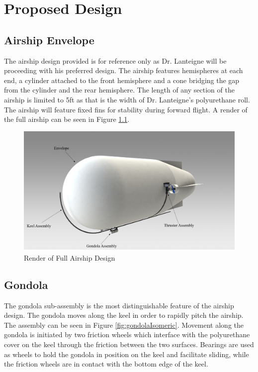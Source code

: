 \documentclass[../main.tex]{subfiles}
\begin{document}
\chapter{Proposed Design}
\section{Airship Envelope}
The airship design provided is for reference only as Dr. Lanteigne will be proceeding with his preferred design. The airship features hemispheres at each end, a cylinder attached to the front hemisphere and a cone bridging the gap from the cylinder and the rear hemisphere. The length of any section of the airship is limited to 5ft as that is the width of Dr. Lanteigne's polyurethane roll. The airship will feature fixed fins for stability during forward flight. A render of the full airship can be seen in Figure \ref{fig:fullAirship}. 

\begin{figure}[H]
	\centering
	\includegraphics[width=\textwidth]{img/design/fullAirshipPerspective.png}
	\caption{Render of Full Airship Design}
	\label{fig:fullAirship}
\end{figure}

\section{Gondola}
The gondola sub-assembly is the most distinguishable feature of the airship design. The gondola moves along the keel in order to rapidly pitch the airship. The assembly can be seen in  Figure \ref{fig:gondolaIsomeric}. Movement along the gondola is initiated by two friction wheels which interface with the polyurethane cover on the keel through the friction between the two surfaces. Bearings are used as wheels to hold the gondola in position on the keel and facilitate sliding, while the friction wheels are in contact with the bottom edge of the keel. 
\end{document}
